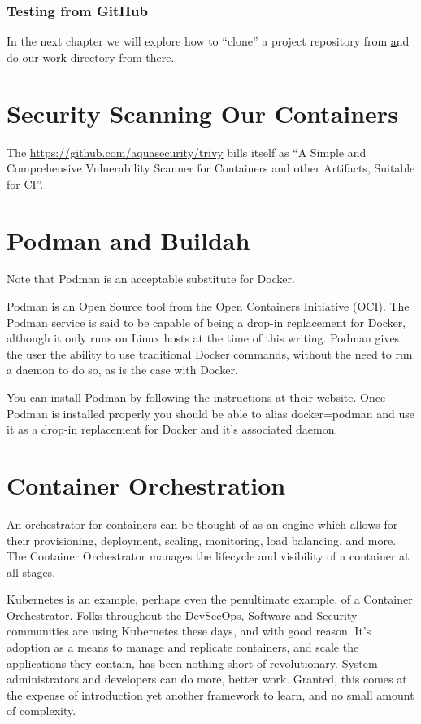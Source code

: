 \subsubsection{Testing from GitHub}
\justify{}
In the next chapter we will explore how to ``clone'' a project repository from 
\href{github.com} and do our work directory from there.

\section{Security Scanning Our Containers}
The \href{trivy container scanner}{https://github.com/aquasecurity/trivy} bills itself
as ``A Simple and Comprehensive Vulnerability Scanner for Containers and other
Artifacts, Suitable for CI''.

\section{Podman and Buildah}
\justify{}
Note that Podman is an acceptable substitute for Docker.

\justify{}
Podman is an Open Source tool from the Open
Containers Initiative (OCI). The Podman service is said to be capable
of being a drop-in replacement for Docker, although it only
runs on Linux hosts at the time of this writing. Podman gives
the user the ability to use traditional Docker commands,
without the need to run a daemon to do so\cite{podman}, as is
the case with Docker.

\justify{}
You can install Podman by 
\href{https://podman.io/getting-started/installation.html}{following the instructions}
at their website. Once Podman is installed properly you
should be able to alias docker=podman and use it as a
drop-in replacement for Docker and it's associated daemon.

\section{Container Orchestration}

\justify{}
An orchestrator for containers can be thought of as an engine which
allows for their provisioning, deployment, scaling, monitoring, load
balancing, and more. The Container Orchestrator manages the
lifecycle and visibility of a container at all stages.

\justify{}
Kubernetes is an example, perhaps even the
penultimate example, of a Container Orchestrator.
Folks throughout the DevSecOps, Software and
Security communities are using Kubernetes these days, and
with good reason. It's adoption as a means to manage and
replicate containers, and scale the applications they contain,
has been nothing short of revolutionary. System administrators
and developers can do more, better work. Granted, this comes at
the expense of introduction yet another framework to learn, and
no small amount of complexity.

